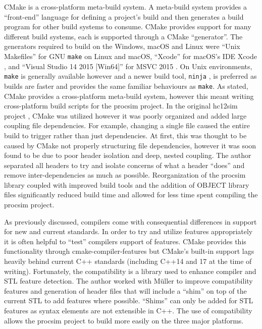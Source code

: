 CMake \cite{Kitware:CMake} is a cross-platform meta-build system. A meta-build system provides a ``front-end'' language for defining a project's build and then generates a build program for other build systems to consume. CMake provides support for many different build systems, each is supported through a CMake ``generator''. The generators required to build on the Windows, macOS and Linux were ``Unix Makefiles'' for GNU \verb|make| \cite{GNU:Make} on Linux and macOS, ``Xcode'' for macOS's IDE Xcode \cite{Apple:Xcode}, and ``Visual Studio 14 2015 [Win64]'' for MSVC 2015 \cite{CMake:Generators}. On Unix environments, \verb|make| is generally available however and a newer build tool, \verb|ninja| \cite{NinjaBuild}, is preferred as builds are faster and provides the same familiar behaviours as \verb|make|. As stated, CMake provides a cross-platform meta-build system, however this meant writing cross-platform build scripts for the procsim project. In the original hc12sim project \cite{Brightwell2013}, CMake was utilized however it was poorly organized and added large coupling file dependencies. For example, changing a single file caused the entire build to trigger rather than just dependencies. At first, this was thought to be caused by CMake not properly structuring file dependencies, however it was soon found to be due to poor header isolation and deep, nested coupling. The author separated all headers to try and isolate concerns of what a header ``does'' and remove inter-dependencies as much as possible. Reorganization of the procsim library coupled with improved build tools and the addition of OBJECT library files \cite{CMake:add_library:ObjectLibraries} significantly reduced build time and allowed for less time spent compiling the procsim project. 

As previously discussed, compilers come with consequential differences in support for new and current standards. In order to try and utilize features appropriately it is often helpful to ``test'' compilers support of features. CMake provides this functionality through cmake-compiler-features \cite{CMake:compile-features} but CMake's built-in support lags heavily behind current C++ standards (including C++14 and 17 at the time of writing). Fortunately, the compatibility \cite{CMakeCompatibility} is a library used to enhance compiler and STL feature detection. The author worked with M\"uller to improve compatibility features and generation of header files that will include a ``shim'' on top of the current STL to add features where possible. ``Shims'' can only be added for STL features as syntax elements are not extensible in C++. The use of compatibility allows the procsim project to build more easily on the three major platforms. 

